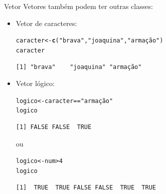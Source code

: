 \documentclass[10pt,handout]{beamer}\usepackage[]{graphicx}\usepackage[]{color}
\makeatletter
\newcommand{\hlnum}[1]{\textcolor[rgb]{0.686,0.059,0.569}{#1}}%
\newcommand{\hlstr}[1]{\textcolor[rgb]{0.282,0.239,0.545}{#1}}%
\newcommand{\hlopt}[1]{\textcolor[rgb]{0,0,0}{#1}}%
\newcommand{\hlstd}[1]{\textcolor[rgb]{0.345,0.345,0.345}{#1}}%
\newcommand{\hlkwb}[1]{\textcolor[rgb]{0.69,0.353,0.396}{#1}}%
\newcommand{\hlkwd}[1]{\textcolor[rgb]{0.282,0.239,0.545}{\textbf{#1}}}%
\newenvironment{kframe}{%
 \def\at@end@of@kframe{}%
 \ifinner\ifhmode%
  \def\at@end@of@kframe{\end{minipage}}%
  \begin{minipage}{\columnwidth}%
 \fi\fi%
 \def\FrameCommand##1{\hskip\@totalleftmargin \hskip-\fboxsep
 \colorbox{shadecolor}{##1}\hskip-\fboxsep
     \hskip-\linewidth \hskip-\@totalleftmargin \hskip\columnwidth}%
 \MakeFramed {\advance\hsize-\width
   \@totalleftmargin\z@ \linewidth\hsize
   \@setminipage}}%
 {\par\unskip\endMakeFramed%
 \at@end@of@kframe}
\newenvironment{knitrout}{}{} %
\makeatother
\begin{document}
\begin{frame}[fragile]{Vetor}
Vetores também podem ter outras classes:
\begin{itemize}
\item Vetor de caracteres:
\begin{knitrout}\small
{}\color{fgcolor}\begin{kframe}
\begin{alltt}
\hlstd{caracter} \hlkwb{<-} \hlkwd{c}\hlstd{(}\hlstr{"brava"}\hlstd{,} \hlstr{"joaquina"}\hlstd{,} \hlstr{"armação"}\hlstd{)}
\hlstd{caracter}
\end{alltt}
\begin{verbatim}
[1] "brava"    "joaquina" "armação" 
\end{verbatim}
\end{kframe}
\end{knitrout}

\item Vetor lógico:
\begin{knitrout}\small
{}\color{fgcolor}\begin{kframe}
\begin{alltt}
\hlstd{logico} \hlkwb{<-} \hlstd{caracter} \hlopt{==} \hlstr{"armação"}
\hlstd{logico}
\end{alltt}
\begin{verbatim}
[1] FALSE FALSE  TRUE
\end{verbatim}
\end{kframe}
\end{knitrout}

ou
\begin{knitrout}\small
{}\color{fgcolor}\begin{kframe}
\begin{alltt}
\hlstd{logico} \hlkwb{<-} \hlstd{num} \hlopt{>} \hlnum{4}
\hlstd{logico}
\end{alltt}
\begin{verbatim}
[1]  TRUE  TRUE FALSE FALSE  TRUE  TRUE
\end{verbatim}
\end{kframe}
\end{knitrout}

\end{itemize}
\end{frame}
\end{document}
